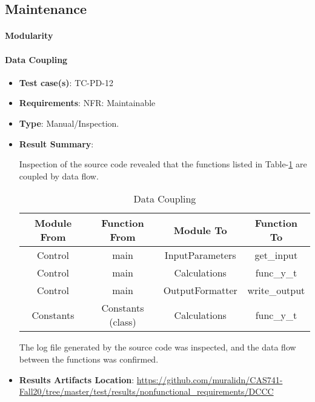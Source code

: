 \documentclass[12pt, titlepage]{article}
\begin{document}
\subsection{Maintenance}

\paragraph{Modularity}

\paragraph{Data Coupling}

\begin{itemize}

\item \textbf{Test case(s)}: TC-PD-12

\item \textbf{Requirements}: NFR: Maintainable

\item \textbf{Type}: Manual/Inspection.

\item \textbf{Result Summary}: 

Inspection of the source code revealed that the functions listed in Table-\ref{tab:dataCoupling} 
are coupled by data flow.

\begin{table}[]
\caption{Data Coupling}
\label{tab:dataCoupling}
\begin{tabular}{c|c|c|c}
\multicolumn{1}{c|}{Module From} & \multicolumn{1}{c|}{Function From} & Module To         & Function To     \\ \hline
Control                      & main                           & InputParameters & get\_input    \\
Control                      & main                           & Calculations    & func\_y\_t    \\
Control                      & main                           & OutputFormatter & write\_output \\
Constants                   & Constants (class)         & Calculations    & func\_y\_t    \\
\end{tabular}
\end{table}

The log file generated by the source code was inspected, and the data flow between the 
functions was confirmed. 

\item \textbf{Results Artifacts Location}:  \url{https://github.com/muralidn/CAS741-Fall20/tree/master/test/results/nonfunctional_requirements/DCCC}

\end{itemize}
\end{document}
